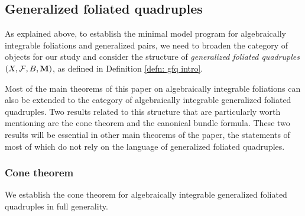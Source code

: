 \documentclass[11pt]{amsart}
\numberwithin{equation}{section}
\newcommand{\Mm}{{\bf{M}}}
\newcommand{\Ff}{\mathcal{F}}
\theoremstyle{definition}
\theoremstyle{definition}
\theoremstyle{definition}
\begin{document}
\subsection{Generalized foliated quadruples}

As explained above, to establish the minimal model program for algebraically integrable foliations and generalized pairs, we need to broaden the category of objects for our study and consider the structure of \emph{generalized foliated quadruples} $(X,\Ff,B,\Mm)$, as defined in Definition \ref{defn: gfq intro}.

Most of the main theorems of this paper on algebraically integrable foliations can also be extended to the category of algebraically integrable generalized foliated quadruples. Two results related to this structure that are particularly worth mentioning are the cone theorem and the canonical bundle formula. These two results will be essential in other main theorems of the paper, the statements of most of which do not rely on the language of generalized foliated quadruples.

\subsubsection{Cone theorem} We establish the cone theorem for algebraically integrable generalized foliated quadruples in full generality. 
\end{document}
